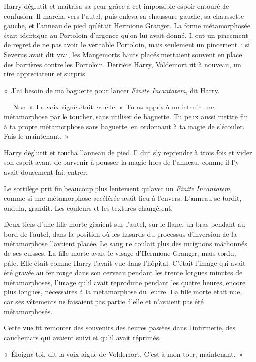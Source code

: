 Harry déglutit et maîtrisa sa peur grâce à cet impossible espoir entouré de confusion. Il marcha vers l'autel, puis enleva sa chaussure gauche, sa chaussette gauche, et l'anneau de pied qu'était Hermione Granger. La forme métamorphosée était identique au Portoloin d'urgence qu'on lui avait donné. Il eut un pincement de regret de ne pas avoir le véritable Portoloin, mais seulement un pincement~: si Severus avait dit vrai, les Mangemorts hauts placés mettaient souvent en place des barrières contre les Portoloin. Derrière Harry, Voldemort rit à nouveau, un rire appréciateur et surpris.

«~J'ai besoin de ma baguette pour lancer \emph{Finite Incantatem}, dit Harry.

--- Non~». La voix aiguë était cruelle. «~Tu as appris à maintenir une métamorphose par le toucher, sans utiliser de baguette. Tu peux aussi mettre fin à ta propre métamorphose sans baguette, en ordonnant à ta magie de s'écouler. Fais-le maintenant.~»

Harry déglutit et toucha l'anneau de pied. Il dut s'y reprendre à trois fois et vider son esprit avant de parvenir à pousser la magie hors de l'anneau, comme il l'y avait doucement fait entrer.

Le sortilège prit fin beaucoup plus lentement qu'avec un \emph{Finite Incantatem}, comme si une métamorphose accélérée avait lieu à l'envers. L'anneau se tordit, ondula, grandit. Les couleurs et les textures changèrent.

Deux tiers d'une fille morte gisaient sur l'autel, sur le flanc, un bras pendant au bord de l'autel, dans la position où les hasards du processus d'inversion de la métamorphose l'avaient placée. Le sang ne coulait plus des moignons mâchonnés de ses cuisses. La fille morte avait le visage d'Hermione Granger, mais tordu, pâle. Elle était comme Harry l'avait vue dans l'hôpital. C'était l'image qui avait été gravée au fer rouge dans son cerveau pendant les trente longues minutes de métamorphoses, l'image qu'il avait reproduite pendant les quatre heures, encore plus longues, nécessaires à la métamorphose du leurre. La fille morte était nue, car ses vêtements ne faisaient pas partie d'elle et n'avaient pas été métamorphosés.

Cette vue fit remonter des souvenirs des heures passées dans l'infirmerie, des cauchemars qui avaient suivi et qu'il avait réprimés.

«~Éloigne-toi, dit la voix aiguë de Voldemort. C'est à mon tour, maintenant.~»

